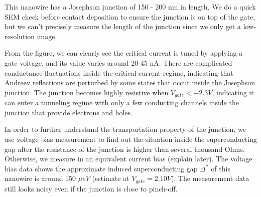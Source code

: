 This nanowire has a Josephson junction of 150 - 200 nm in length. We do a quick SEM check before contact deposition to ensure the junction is on top of the gate, but we can't precisely measure the length of the junction since we only get a low-resolution image.

From the figure, we can clearly see the critical current is tuned by applying a gate voltage, and its value varies around 20-45 nA. There are complicated conductance fluctuations inside the critical current regime, indicating that Andreev reflections are perturbed by some states that occur inside the Josephson junction. The junction becomes highly resistive when $V_{gate} < -2.3 V$, indicating it can enter a tunneling regime with only a few conducting channels inside the junction that provide electrons and holes. 

In order to further understand the transportation property of the junction, we use voltage bias measurement to find out the situation inside the superconducting gap after the resistance of the junction is higher than several thousand Ohms. Otherwise, we measure in an equivalent current bias (explain later). The voltage bias data shows the approximate induced superconducting gap $\Delta^*$ of this nanowire is around 150 $\mu eV$ (estimate at $V_{gate} = 2.10 V$). The measurement data still looks noisy even if the junction is close to pinch-off. 

